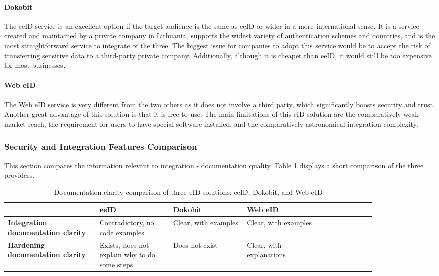 \paragraph{Dokobit}

The eeID service is an excellent option if the target audience is the same as eeID or wider in a more international sense. It is a service created and maintained by a private company in Lithuania, supports the widest variety of authentication schemes and countries, and is the most straightforward service to integrate of the three. The biggest issue for companies to adopt this service would be to accept the risk of transferring sensitive data to a third-party private company. Additionally, although it is cheaper than eeID, it would still be too expensive for most businesses.

\paragraph{Web eID}

The Web eID service is very different from the two others as it does not involve a third party, which significantly boosts security and trust. Another great advantage of this solution is that it is free to use. The main limitations of this eID solution are the comparatively weak market reach, the requirement for users to have special software installed, and the comparatively astronomical integration complexity.

\subsubsection{Security and Integration Features Comparison}

This section compares the information relevant to integration - documentation quality. Table \ref{tbl:summary-comparison-docs} displays a short comparison of the three providers.

\begin{table}
    \centering
    \begin{tabular}{ >{\raggedright}p{0.25\linewidth} | >{\raggedright}p{0.2\linewidth} | >{\raggedright}p{0.2\linewidth} | >{\raggedright}p{0.2\linewidth} p{0px}}
                                                   & \textbf{eeID}                                 & \textbf{Dokobit}     & \textbf{Web eID}         & \\
        \hline
        \textbf{Integration documentation clarity} & Contradictory, no code examples               & Clear, with examples & Clear, with examples     & \\
        \hline
        \textbf{Hardening documentation clarity}   & Exists, does not explain why to do some steps & Does not exist       & Clear, with explanations & \\
    \end{tabular}
    \caption{Documentation clarity comparison of three eID solutions: eeID, Dokobit, and Web eID}
    \label{tbl:summary-comparison-docs}
\end{table}

